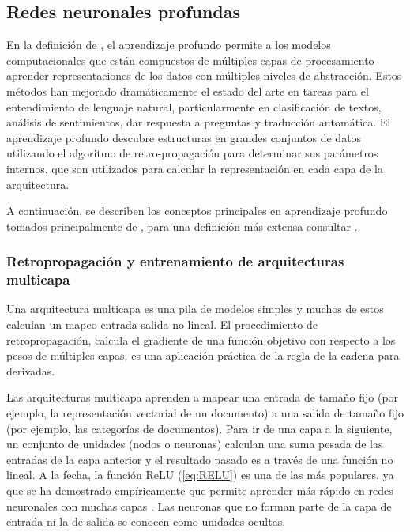 \subsection{Redes neuronales profundas}

En la definición de \citep{lecun2015deep}, el aprendizaje profundo permite a los modelos computacionales que están compuestos de múltiples capas de procesamiento aprender representaciones de los datos con múltiples niveles de abstracción. Estos métodos han mejorado dramáticamente el estado del arte en tareas para el entendimiento de lenguaje natural, particularmente en clasificación de textos, análisis de sentimientos, dar respuesta a preguntas y traducción automática. El aprendizaje profundo descubre estructuras en grandes conjuntos de datos utilizando el algoritmo de retro-propagación para determinar sus parámetros internos, que son utilizados para calcular la representación en cada capa de la arquitectura. 

A continuación, se describen los conceptos principales en aprendizaje profundo tomados principalmente de \citep{lecun2015deep}, para una definición más extensa consultar \citep{goodfellow2016deep, kamath2019deep}.

\subsubsection{Retropropagación y entrenamiento de arquitecturas multicapa}

Una arquitectura multicapa es una pila de modelos simples y muchos de estos calculan un mapeo entrada-salida no lineal. El procedimiento de retropropagación, calcula el gradiente de una función objetivo con respecto a los pesos de múltiples capas, es una aplicación práctica de la regla de la cadena para derivadas. 

  

Las arquitecturas multicapa aprenden a mapear una entrada de tamaño fijo (por ejemplo, la representación vectorial de un documento) a una salida de tamaño fijo (por ejemplo, las categorías de documentos). Para ir de una capa a la siguiente, un conjunto de unidades (nodos o neuronas) calculan una suma pesada de las entradas de la capa anterior y el resultado pasado es a través de una función no lineal. A la fecha, la función ReLU (\ref{eq:RELU})  es una de las más populares, ya que se ha demostrado empíricamente que permite aprender más rápido en redes neuronales con muchas capas \citep{glorot2011deep}. Las neuronas que no forman parte de la capa de entrada ni la de salida se conocen como unidades ocultas. 

